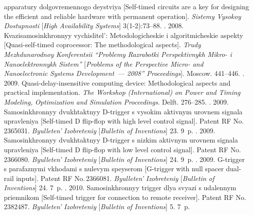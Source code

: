 \begin{multicols}{2}
{{\begin{thebibliography}{99}
apparatury dolgovremennogo deystviya 
[Self-timed circuits are a key for designing the efficient and reliable 
hardware with permanent operation]. \textit{Sistemy Vysokoy Dostupnosti} 
[\textit{High Availability Systems}] 3(1-2):73--88.
. 
2008. Kvazisamosinkhronnyy vychislitel': Metodo\-lo\-gi\-che\-skie i algoritmicheskie aspekty 
[Quasi-self-timed\linebreak
 coprocessor: The methodological aspects]. 
\textit{Trudy Mezhdunarodnoy Konferentsii ``Problemy Razrabotki Perspektivnykh 
Mikro- i Nanoelektronnykh Sistem''} [\textit{Problems of the Perspective Micro- and 
Nanoelectronic Systems Development~--- 2008'' Proceedings}]. Moscow. 441--446.
. 2009. 
Quasi-delay-insensitive computing device: Methodological aspects and practical implementation. 
\textit{The Workshop (International) on Power and Timing Modeling, Optimization and 
Simulation Proceedings}. Delft. 276--285.
. 2009. Samosinkhronnyy dvukhtaktnyy D-trigger s vysokim aktivnym 
urovnem signala upravleniya [Self-timed D flip-flop with high level control signal]. 
Patent RF No.\,2365031.  \textit{Byulleten' Izobreteniy} 
[\textit{Bulletin of Inventions}] 23. 9~p.
. 2009. Samosinkhronnyy dvukhtaktnyy D-trigger s nizkim aktivnym 
urovnem signala upravleniya [Self-timed D flip-flop with low level control signal]. 
Patent RF No.\,2366080. \textit{Byulleten' Izobreteniy} [\textit{Bulletin of Inventions}] 24. 9~p.
. 
2009. G-trigger s parafaznymi vkhodami s nulevym spey\-se\-rom 
[G-trigger with null spacer dual-rail inputs]. 
Patent RF No.\,2366081. \textit{Byulleten' Izobreteniy} [\textit{Bulletin of Inventions}] 24.
7~p.
. 2010. Sa\-mo\-sin\-khronnyy trigger dlya svyazi s udalennym 
priemnikom [Self-timed trigger for connection to remote receiver]. Patent RF No.\,2382487. 
\textit{Byulleten' Izobreteniy} [\textit{Bulletin of Inventions}] 5. 7~p.
\end{thebibliography}}}
\end{multicols}
